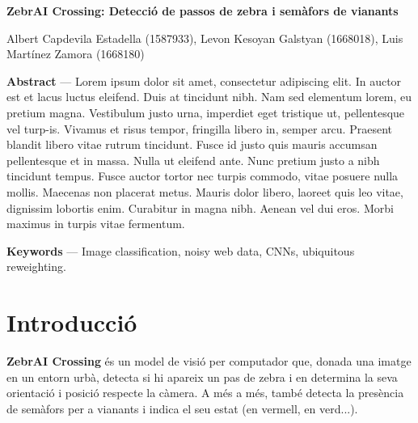 \documentclass[10pt,a4paper,twocolumn,twoside]{article}
\begin{document}
{\sffamily
\noindent\textbf{\LARGE ZebrAI Crossing: Detecció de passos de zebra i semàfors de vianants}
\begin{center}
Albert Capdevila Estadella (1587933), Levon Kesoyan Galstyan (1668018), Luis Martínez Zamora (1668180)
\end{center}

\bigskip

\noindent 
\textbf{Abstract} --- Lorem ipsum dolor sit amet, consectetur adipiscing elit. In auctor est et lacus luctus eleifend. Duis at tincidunt nibh. Nam sed elementum lorem, eu pretium magna. Vestibulum justo urna, imperdiet eget tristique ut, pellentesque vel turp-is. Vivamus et risus tempor, fringilla libero in, semper arcu. Praesent blandit libero vitae rutrum tincidunt. Fusce id justo quis mauris accumsan pellentesque et in massa. Nulla ut eleifend ante. Nunc pretium justo a nibh tincidunt tempus. Fusce auctor tortor nec turpis commodo, vitae posuere nulla mollis. Maecenas non placerat metus. Mauris dolor libero, laoreet quis leo vitae, dignissim lobortis enim. Curabitur in magna nibh. Aenean vel dui eros. Morbi maximus in turpis vitae fermentum.

\bigskip

\noindent 
\textbf{Keywords} --- Image classification, noisy web data, CNNs, ubiquitous reweighting.

%

{\vrule depth 0pt height 0.5pt width 3cm\hspace{7.5pt}%
%
\hspace{7.5pt}\vrule depth 0pt height 0.5pt width 3cm\relax}

}

\section{Introducció}

\textbf{ZebrAI Crossing} és un model de visió per computador que, donada una imatge en un entorn urbà, detecta si hi apareix un pas de zebra i en determina la seva orientació i posició respecte la càmera. A més a més, també detecta la presència de semàfors per a vianants i indica el seu estat (en vermell, en verd...).
\end{document}
